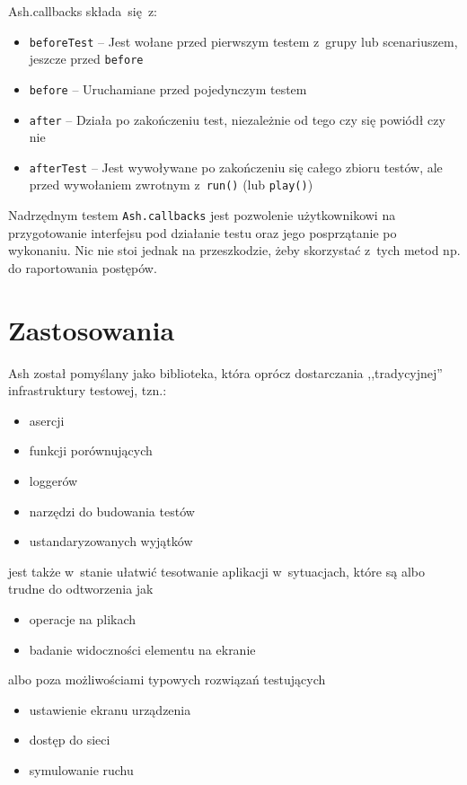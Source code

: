 \documentclass[brudnopis]{xmgr}
\begin{document}
Ash.callbacks składa~się~z:

\begin{itemize}
  \item \texttt{beforeTest} -- Jest wołane przed pierwszym testem z~grupy lub scenariuszem, jeszcze przed \texttt{before}
  \item \texttt{before} -- Uruchamiane przed pojedynczym testem
  \item \texttt{after} -- Działa po zakończeniu test, niezależnie od tego czy się powiódł czy nie
  \item \texttt{afterTest} -- Jest wywoływane po zakończeniu się całego zbioru testów, ale przed wywołaniem zwrotnym z~\texttt{run()} (lub \texttt{play()}) 
\end{itemize}

Nadrzędnym testem \texttt{Ash.callbacks} jest pozwolenie użytkownikowi na przygotowanie interfejsu pod działanie testu oraz jego posprzątanie po wykonaniu. Nic nie stoi jednak na przeszkodzie, żeby skorzystać z~tych metod np. do raportowania postępów.

\chapter{Zastosowania}
Ash został pomyślany jako biblioteka, która oprócz dostarczania ,,tradycyjnej'' infrastruktury testowej, tzn.:
\begin{itemize}
  \item asercji
  \item funkcji porównujących
  \item loggerów
  \item narzędzi do budowania testów
  \item ustandaryzowanych wyjątków
\end{itemize}
jest także w~stanie ułatwić tesotwanie aplikacji w~sytuacjach, które są albo trudne do odtworzenia jak
\begin{itemize}
  \item operacje na plikach
  \item badanie widoczności elementu na ekranie
\end{itemize}
 albo poza możliwościami typowych rozwiązań testujących
\begin{itemize}
  \item ustawienie ekranu urządzenia
  \item dostęp do sieci
  \item symulowanie ruchu
\end{itemize}
\end{document}
